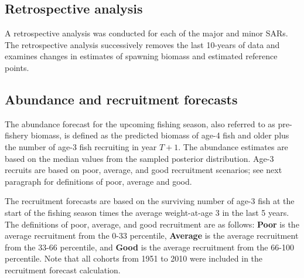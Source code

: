 		
	\subsection{Retrospective analysis}
	A retrospective analysis was conducted for each of the major and minor SARs.  The retrospective analysis successively removes the last 10-years of data and examines changes in estimates of spawning biomass and estimated reference points.  
	
	\subsection{Abundance and recruitment forecasts}
	The abundance forecast for the upcoming fishing season, also referred to as pre-fishery biomass, is defined as the predicted biomass of age-4 fish and older plus the number of age-3 fish recruiting in year $T+1$.  The abundance estimates are based on the median values from the sampled posterior distribution.  Age-3 recruits are based on poor, average, and good recruitment scenarios; see next paragraph for definitions of poor, average and good.
	
	The recruitment forecasts are based on the surviving number of age-3 fish at the start of the fishing season times the average weight-at-age 3 in the last 5 years. The definitions of poor, average, and good recruitment are as follows: \textbf{Poor} is the average recruitment from the 0-33 percentile, \textbf{Average} is the average recruitment from the 33-66 percentile, and \textbf{Good} is the average recruitment from the 66-100 percentile.  Note that all cohorts from 1951 to 2010  were included in the recruitment forecast calculation.	

	
	
